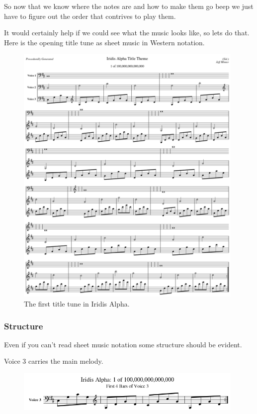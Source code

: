 So now that we know where the notes are and how to make them go beep we just have to figure out the order that 
contrives to play them.

It would certainly help if we could see what the music looks like, so lets do that. Here is the opening title tune as sheet
music in Western notation.

\begin{figure}[H]
{
  \begin{adjustbox}{width=11cm,center}
  \includegraphics[width=11cm]{music/title_no_1_page_1001.png}%
    \end{adjustbox}
}\caption[]{The first title tune in Iridis Alpha.}
\end{figure}

\subsubsection{Structure}
Even if you can't read sheet music notation some structure should be evident.

Voice 3 carries the main melody. 

\begin{figure}[H]
{
  \begin{adjustbox}{width=11cm,center}
  \includegraphics[width=11cm]{music/Voice_3_Part.png}%
    \end{adjustbox}
}
\end{figure}

